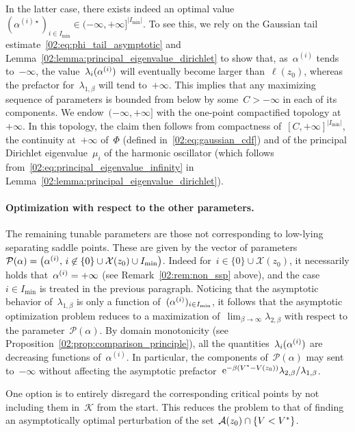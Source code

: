     In the latter case, there exists indeed an optimal value~$\left(\alpha^{(i)\star}\right)_{i\in I_{\min}}\in (-\infty,+\infty]^{|I_{\min}|}$. To see this, we rely on the Gaussian tail estimate~\eqref{02:eq:phi_tail_asymptotic} and Lemma~\ref{02:lemma:principal_eigenvalue_dirichlet} to show that, as~$\alpha^{(i)}$ tends to~$-\infty$, the value~$\lambda_i(\alpha^{(i)})$ will eventually become larger than~$\ell(z_0)$, whereas the prefactor for~$\lambda_{1,\beta}$ will tend to~$+\infty$. This implies that any maximizing sequence of parameters is bounded from below by some~$C>-\infty$ in each of its components.
    We endow~$(-\infty,+\infty]$ with the one-point compactified topology at~$+\infty$.
    In this topology, the claim then follows from compactness of~$[C,+\infty]^{|I_{\min}|}$, the continuity at~$+\infty$ of~$\Phi$ (defined in~\eqref{02:eq:gaussian_cdf}) and of the principal Dirichlet eigenvalue~$\mu_i$ of the harmonic oscillator (which follows from~\eqref{02:eq:principal_eigenvalue_infinity} in Lemma~\ref{02:lemma:principal_eigenvalue_dirichlet}).
    
    \paragraph{Optimization with respect to the other parameters.}
    The remaining tunable parameters are those not corresponding to low-lying separating saddle points. These are given by the vector of parameters~$\mathcal P(\alpha) =\left(\alpha^{(i)},\,i\not\in \{0\}\cup\mathcal X(z_0)\cup I_{\min}\right)$. Indeed for~$i\in \{0\}\cup\mathcal X(z_0)$, it necessarily holds that~$\alpha^{(i)}=+\infty$ (see Remark~\ref{02:rem:non_ssp} above), and the case~$i\in I_{\min}$ is treated in the previous paragraph.
    Noticing that the asymptotic behavior of~$\lambda_{1,\beta}$ is only a function of~$(\alpha^{(i)})_{i\in I_{\min}}$, it follows that the asymptotic optimization problem reduces to a maximization of~$\lim_{\beta\to\infty}\lambda_{2,\beta}$ with respect to the parameter~$\mathcal P(\alpha)$. By domain monotonicity (see Proposition~\ref{02:prop:comparison_principle}), all the quantities~$\lambda_i(\alpha^{(i)})$
    are decreasing functions of~$\alpha^{(i)}$.
    In particular, the components of~$\mathcal P(\alpha)$ may sent to~$-\infty$ without affecting the asymptotic prefactor~$\mathrm{e}^{-\beta(V^*-V(z_0))}\lambda_{2,\beta}/\lambda_{1,\beta}$.
    
    One option is to entirely disregard the corresponding critical points by not including them in~$\mathcal K$ from the start. This reduces the problem to that of finding an asymptotically optimal perturbation of the set~$\mathcal{A}(z_0)\cap\{V<V^*\}$.


